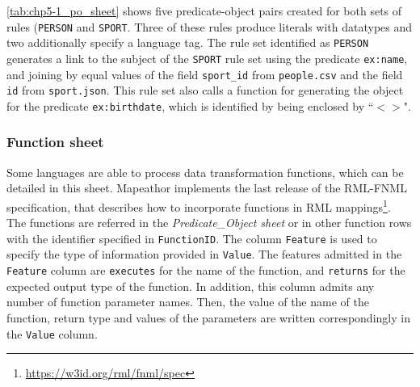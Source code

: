 \cref{tab:chp5-1_po_sheet} shows five predicate-object pairs created for both sets of rules (\texttt{PERSON} and \texttt{SPORT}. Three of these rules produce literals with datatypes and two additionally specify a language tag. The rule set identified as \texttt{PERSON} generates a link to the subject of the \texttt{SPORT} rule set using the predicate \texttt{ex:name}, and joining by equal values of the field \texttt{sport\_id} from \texttt{people.csv} and the field \texttt{id} from \texttt{sport.json}. This rule set also calls a function for generating the object for the predicate \texttt{ex:birthdate}, which is identified by being enclosed by ``$<>$".

\begin{table}[h!]
\caption{Predicate\_Object sheet.}
\label{tab:chp5-1_po_sheet}
\centering
{}
\end{table}

\subsubsection{Function sheet} Some languages are able to process data transformation functions, which can be detailed in this sheet. Mapeathor implements the last release of the RML-FNML specification, that describes how to incorporate functions in RML mappings\footnote{\url{https://w3id.org/rml/fnml/spec}}. The functions are referred in the \textit{Predicate\_Object sheet} or in other function rows with the identifier specified in \texttt{FunctionID}. The column \texttt{Feature} is used to specify the type of information provided in \texttt{Value}. The features admitted in the \texttt{Feature} column are \texttt{executes} for the name of the function, and \texttt{returns} for the expected output type of the function. In addition, this column admits any number of function parameter names. Then, the value of the name of the function, return type and values of the parameters are written correspondingly in the \texttt{Value} column.

